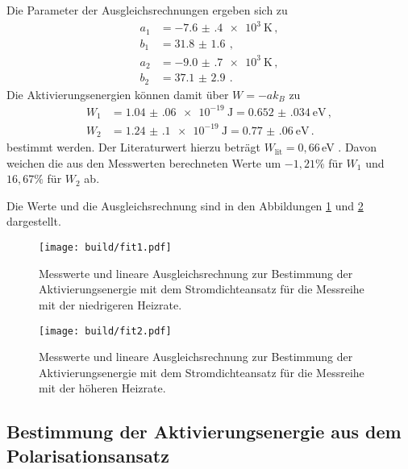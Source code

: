 Die Parameter
der Ausgleichsrechnungen ergeben sich zu
\begin{align*}
  a_1&=\SI{-7.6(4)e+3}{\kelvin} \,, \\
  b_1&=\SI{31.8(16)}{}  \,, \\
  a_2&=\SI{-9.0(7)e+3}{\kelvin} \,, \\
  b_2&=\SI{37.1(29)}{}  \,.
\end{align*}
Die Aktivierungsenergien können damit über $W=-ak_B$ zu
\begin{align*}
 W_1&=\SI{1.04(06)e-19}{\joule}= \SI{0.652(034)}{\eV}  \,, \\
 W_2&=\SI{1.24(10)e-19}{\joule}=\SI{0.77(06)}{\eV} \,.
\end{align*}
bestimmt werden. Der Literaturwert hierzu beträgt $W_{\text{lit}}=0{,}66\,$eV \cite{lit}. Davon weichen
die aus den Messwerten berechneten Werte um $-1{,}21\%$ für $W_1$ und $16{,}67\%$ für
$W_2$ ab.

Die Werte und die Ausgleichsrechnung sind in den Abbildungen \ref{fig:fit1} und
\ref{fig:fit2} dargestellt.

\begin{figure}
  \centering
  \texttt{[image: build/fit1.pdf]}
  \caption{Messwerte und lineare Ausgleichsrechnung zur Bestimmung der Aktivierungsenergie mit dem Stromdichteansatz für
  die Messreihe mit der niedrigeren Heizrate.}
  \label{fig:fit1}
\end{figure}
\begin{figure}
  \centering
  \texttt{[image: build/fit2.pdf]}
  \caption{Messwerte und lineare Ausgleichsrechnung zur Bestimmung der Aktivierungsenergie mit dem Stromdichteansatz für
  die Messreihe mit der höheren Heizrate.}
  \label{fig:fit2}
\end{figure}

\newpage
\subsection{Bestimmung der Aktivierungsenergie aus dem Polarisationsansatz}

